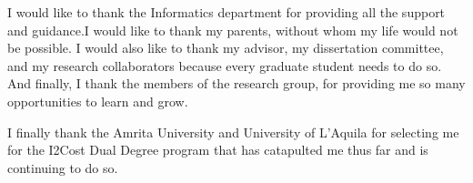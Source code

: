I would like to thank the Informatics department for providing all the support and guidance.I would like to thank my parents, without whom my life would not be possible. I would also like to thank my advisor, my dissertation committee, and my research collaborators because every graduate student needs to do so. And finally, I thank the members of the research group, for providing me so many opportunities to learn and grow. 

I finally thank the Amrita University and University of L'Aquila for selecting me for the I2Cost Dual Degree program that has catapulted me thus far and is continuing to do so. 